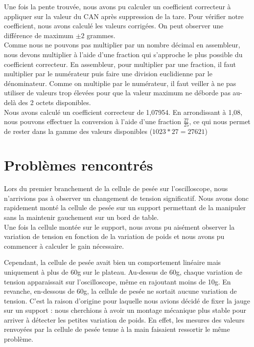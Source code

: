 \documentclass[a4paper,11pt,titlepage]{article}
\begin{document}

Une fois la pente trouvée, nous avons pu calculer un coefficient correcteur à appliquer sur la valeur du CAN après suppression de la tare. Pour vérifier notre coefficient, nous avons calculé les valeurs corrigées. On peut observer une différence de maximum $\pm{2}$ grammes.\\

Comme nous ne pouvons pas multiplier par un nombre décimal en assembleur, nous devons multiplier à l'aide d'une fraction qui s'approche le plus possible du coefficient correcteur. En assembleur, pour multiplier par une fraction, il faut multiplier par le numérateur puis faire une division euclidienne par le dénominateur. Comme on multiplie par le numérateur, il faut veiller à ne pas utiliser de valeurs trop élevées pour que la valeur maximum ne déborde pas au-delà des 2 octets disponibles.\\

Nous avons calculé un coefficient correcteur de 1,07954. En arrondissant à 1,08, nous pouvons effectuer la conversion à l'aide d'une fraction $\frac{27}{25}$, ce qui nous permet de rester dans la gamme des valeurs disponibles ($1023 * 27 = 27621$)\\

\section{Problèmes rencontrés}

Lors du premier branchement de la cellule de pesée sur l'oscilloscope, nous n'arrivions pas à observer un changement de tension significatif. Nous avons donc rapidement monté la cellule de pesée sur un support permettant de la manipuler sans la maintenir gauchement sur un bord de table.\\

Une fois la cellule montée sur le support, nous avons pu aisément observer la variation de tension en fonction de la variation de poids et nous avons pu commencer à calculer le gain nécessaire.

Cependant, la cellule de pesée avait bien un comportement linéaire mais uniquement à plus de 60g sur le plateau. Au-dessus de 60g, chaque variation de tension apparaissait sur l'oscilloscope, même en rajoutant moins de 10g. En revanche, en-dessous de 60g, la cellule de pesée ne sortait aucune variation de tension. C'est la raison d'origine pour laquelle nous avions décidé de fixer la jauge sur un support : nous cherchions à avoir un montage mécanique plus stable pour arriver à détecter les petites variation de poids. En effet, les mesures des valeurs renvoyées par la cellule de pesée tenue à la main faisaient ressortir le même problème.
\end{document}
